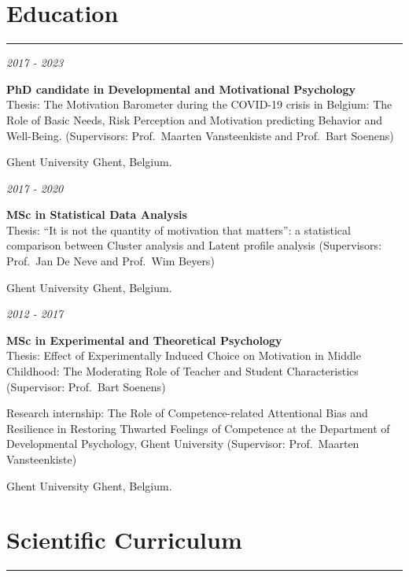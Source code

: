 \documentclass[
  twocolumn]{article}
\begin{document}
\hypertarget{education}{%
\section{\texorpdfstring{Education }{Education }}\label{education}}

\begin{center}\rule{0.5\linewidth}{0.5pt}\end{center}

\emph{2017 - 2023}

\textbf{PhD candidate in Developmental and Motivational Psychology}\\
Thesis: The Motivation Barometer during the COVID-19 crisis in Belgium:
The Role of Basic Needs, Risk Perception and Motivation predicting
Behavior and Well-Being. (Supervisors: Prof.~Maarten Vansteenkiste and
Prof.~Bart Soenens)

Ghent University Ghent, Belgium.

\emph{2017 - 2020}

\textbf{MSc in Statistical Data Analysis}\\
Thesis: ``It is not the quantity of motivation that matters'': a
statistical comparison between Cluster analysis and Latent profile
analysis (Supervisors: Prof.~Jan De Neve and Prof.~Wim Beyers)

Ghent University Ghent, Belgium.

\emph{2012 - 2017}

\textbf{MSc in Experimental and Theoretical Psychology}\\
Thesis: Effect of Experimentally Induced Choice on Motivation in Middle
Childhood: The Moderating Role of Teacher and Student Characteristics
(Supervisor: Prof.~Bart Soenens)

Research internship: The Role of Competence-related Attentional Bias and
Resilience in Restoring Thwarted Feelings of Competence at the
Department of Developmental Psychology, Ghent University (Supervisor:
Prof.~Maarten Vansteenkiste)

Ghent University Ghent, Belgium.

\hypertarget{scientific-curriculum}{%
\section{\texorpdfstring{Scientific Curriculum
}{Scientific Curriculum }}\label{scientific-curriculum}}

\begin{center}\rule{0.5\linewidth}{0.5pt}\end{center}
\end{document}
